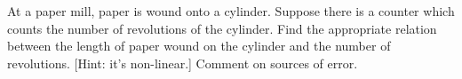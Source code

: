 \documentclass[12pt]{article}
\newenvironment{exercise}[2][Exercise]{\begin{trivlist}
\item[\hskip \labelsep {\bfseries #1}\hskip \labelsep {\bfseries #2.}]}{\end{trivlist}}
\begin{document}
\begin{exercise}{4}
At a paper mill, paper is wound onto a cylinder. Suppose there is a counter which counts the number of revolutions of the cylinder. Find the appropriate relation between the length of paper wound on the cylinder and the number of revolutions. [Hint: it’s non-linear.] Comment on sources of error.
\end{exercise}

 
\end{document}
